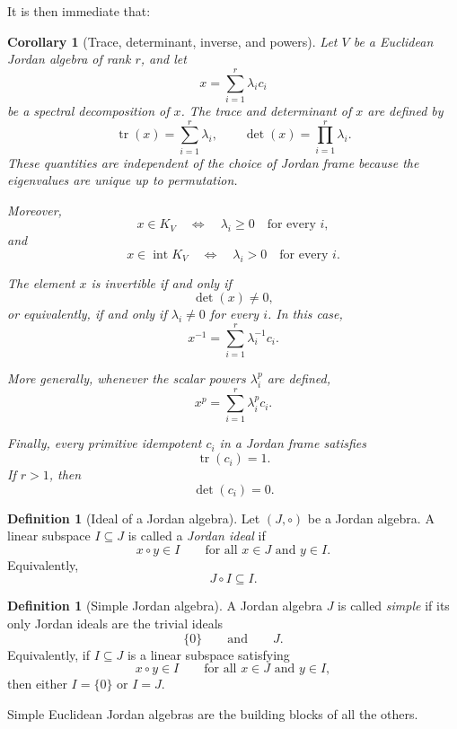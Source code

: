 \documentclass[a4paper,11pt]{book}
\theoremstyle{plain}
\newtheorem{corollary}[theorem]{Corollary}
\theoremstyle{definition}
\newtheorem{definition}[theorem]{Definition}
\theoremstyle{remark}
\numberwithin{equation}{chapter}
\numberwithin{algorithm}{chapter}
\begin{document}
	It is then immediate that:
	
	\begin{corollary}[Trace, determinant, inverse, and powers]
		Let $V$ be a Euclidean Jordan algebra of rank $r$, and let
		\[
		x=\sum_{i=1}^{r}\lambda_i c_i
		\]
		be a spectral decomposition of $x$. The \emph{trace} and \emph{determinant} of
		$x$ are defined by
		\[
		\operatorname{tr}(x)=\sum_{i=1}^{r}\lambda_i,
		\qquad
		\det(x)=\prod_{i=1}^{r}\lambda_i.
		\]
		These quantities are independent of the choice of Jordan frame because the
		eigenvalues are unique up to permutation.
		
		Moreover,
		\[
		x\in K_V
		\quad\Longleftrightarrow\quad
		\lambda_i\geq0
		\quad\text{for every }i,
		\]
		and
		\[
		x\in\operatorname{int}K_V
		\quad\Longleftrightarrow\quad
		\lambda_i>0
		\quad\text{for every }i.
		\]
		
		The element $x$ is invertible if and only if
		\[
		\det(x)\neq0,
		\]
		or equivalently, if and only if $\lambda_i\neq0$ for every $i$. In this case,
		\[
		x^{-1}
		=
		\sum_{i=1}^{r}\lambda_i^{-1}c_i.
		\]
		
		More generally, whenever the scalar powers $\lambda_i^p$ are defined,
		\[
		x^p
		=
		\sum_{i=1}^{r}\lambda_i^p c_i.
		\]
		
		Finally, every primitive idempotent $c_i$ in a Jordan frame satisfies
		\[
		\operatorname{tr}(c_i)=1.
		\]
		If $r>1$, then
		\[
		\det(c_i)=0.
		\]
	\end{corollary}
	
	\begin{definition}[Ideal of a Jordan algebra]
		Let $(J,\circ)$ be a Jordan algebra. A linear subspace $I\subseteq J$ is
		called a \emph{Jordan ideal} if
		\[
		x\circ y\in I
		\qquad\text{for all }x\in J\text{ and }y\in I.
		\]
		Equivalently,
		\[
		J\circ I\subseteq I.
		\]
	\end{definition}
	
	\begin{definition}[Simple Jordan algebra]
		A Jordan algebra $J$ is called \emph{simple} if its only Jordan ideals are
		the trivial ideals
		\[
		\{0\}
		\qquad\text{and}\qquad
		J.
		\]
		Equivalently, if $I\subseteq J$ is a linear subspace satisfying
		\[
		x\circ y\in I
		\qquad\text{for all }x\in J\text{ and }y\in I,
		\]
		then either $I=\{0\}$ or $I=J$.
	\end{definition}
	
	
	Simple Euclidean Jordan algebras are the building blocks of all the others.
	
\end{document}
